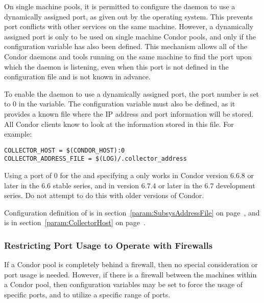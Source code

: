 On single machine pools, 
it is permitted to configure the
 daemon
to use a dynamically assigned port,
as given out by the operating system.
This prevents port conflicts with other services on the same machine.
However, a dynamically assigned port is only to be used on
single machine Condor pools,
and only if the
configuration variable has also been defined.
This mechanism allows all of the Condor daemons and tools running on
the same machine to find the port upon which the 
daemon is listening,
even when this port is not defined in the
configuration file and is not known in advance.

To enable the  daemon to use a dynamically assigned port,
the port number is set to 0 in the 
variable.
The 
configuration variable must also be defined,
as it provides a known file where the IP address
and port information will be stored.
All Condor clients know to look at the
information stored in this file.
For example:
\footnotesize
\begin{verbatim}
COLLECTOR_HOST = $(CONDOR_HOST):0
COLLECTOR_ADDRESS_FILE = $(LOG)/.collector_address
\end{verbatim}
\normalsize

\Note Using a port of 0 for the 
and specifying a
only works in Condor version 6.6.8 or later in the 6.6 stable series,
and in version 6.7.4 or later in the 6.7 development series.
Do not attempt to do this with older versions of Condor.

Configuration definition of 
is in section~\ref{param:SubsysAddressFile} on
page~\pageref{param:SubsysAddressFile},
and
is in
section~\ref{param:CollectorHost} on
page~\pageref{param:CollectorHost}.


\subsubsection{\label{sec:Ports-Firewalls}Restricting Port Usage to
 Operate with Firewalls}

If a Condor pool is completely behind a firewall,
then no special consideration or port usage is needed.
However, if there is a firewall between the machines within
a Condor pool, then
configuration variables may be set to force the usage of
specific ports, and to utilize a specific range of ports.

